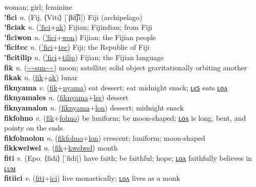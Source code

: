 woman; girl; feminine \label{fimelaktualon} \\
\textbf{'fici} \textit{n.} (Fij. ⟨Viti⟩ [ˈβit͡ʃi])
Fiji (archipelago) \label{'fici} \\
\textbf{'ficiak} \textit{n.} (\hyperref['fici]{'fici}+\hyperref[ak]{ak})
Fijian; Fijindian; from Fiji \label{'ficiak} \\
\textbf{'ficiwon} \textit{n.} (\hyperref['fici]{'fici}+\hyperref[won]{won})
Fijian; the Fijian people \label{'ficiwon} \\
\textbf{'ficitec} \textit{n.} (\hyperref['fici]{'fici}+\hyperref[tec]{tec})
Fiji; the Republic of Fiji \label{'ficitec} \\
\textbf{'ficitilip} \textit{n.} (\hyperref['fici]{'fici}+\hyperref[tilip]{tilip})
Fijian; the Fijian language \label{'ficitilip} \\
\textbf{fik} \textit{n.} (\hyperref[sun]{\~{}\~{}sun\~{}\~{}})
moon; satellite; solid object gravitationally orbiting another \label{fik} \\
\textbf{fikak} \textit{n.} (\hyperref[fik]{fik}+\hyperref[ak]{ak})
lunar \label{fikak} \\
\textbf{fiknyama} \textit{v.} (\hyperref[fik]{fik}+\hyperref[nyama]{nyama})
eat dessert; eat midnight snack; \hyperref[fiknyamales]{ʟєꜱ} eats \hyperref[fiknyamalon]{ʟᴏᴧ} \label{fiknyama} \\
\textbf{fiknyamales} \textit{n.} (\hyperref[fiknyama]{fiknyama}+\hyperref[les]{les})
dessert \label{fiknyamales} \\
\textbf{fiknyamalon} \textit{n.} (\hyperref[fiknyama]{fiknyama}+\hyperref[lon]{lon})
dessert; midnight snack \label{fiknyamalon} \\
\textbf{fikfolmo} \textit{v.} (\hyperref[fik]{fik}+\hyperref[folmo]{folmo})
be luniform; be moon-shaped; \hyperref[fikfolmolon]{ʟᴏᴧ} is long, bent, and pointy on the ends \label{fikfolmo} \\
\textbf{fikfolmolon} \textit{n.} (\hyperref[fikfolmo]{fikfolmo}+\hyperref[lon]{lon})
crescent; luniform; moon-shaped \label{fikfolmolon} \\
\textbf{fikkwelwel} \textit{n.} (\hyperref[fik]{fik}+\hyperref[kwelwel]{kwelwel})
month \label{fikkwelwel} \\
\textbf{fiti} \textit{v.} (Epo. ⟨fidi⟩ [ˈfidi])
have faith; be faithful; hope; \hyperref[fitilon]{ʟᴏᴧ} faithfully believes in \hyperref[fitilum]{ʟᴜᴍ} \label{fiti} \\
\textbf{fitiici} \textit{v.} (\hyperref[fiti]{fiti}+\hyperref[ici]{ici})
live monastically; \hyperref[fitiicilon]{ʟᴏᴧ} lives as a monk \label{fitiici} \\
